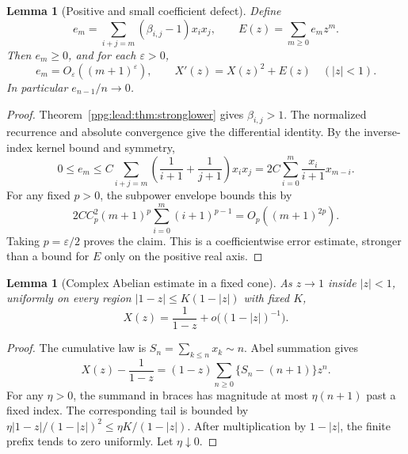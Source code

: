 \documentclass[11pt,letterpaper]{article}
\newtheorem{lemma}[theorem]{Lemma}
\theoremstyle{remark}\newtheorem{remark}[theorem]{Remark}
\numberwithin{equation}{section}
\begin{document}
\begin{lemma}[Positive and small coefficient defect]\label{ppg:lead:lem:defect}
Define
\[
 e_m=\sum_{i+j=m}(\beta_{i,j}-1)x_ix_j,\qquad
 E(z)=\sum_{m\ge0}e_mz^m.
\]
Then $e_m\ge0$, and for each $\varepsilon>0$,
\begin{equation}\label{ppg:lead:eq:smallE}
 e_m=O_\varepsilon((m+1)^\varepsilon),\qquad
 X'(z)=X(z)^2+E(z)\quad(|z|<1).
\end{equation}
In particular $e_{n-1}/n\to0$.
\end{lemma}
\begin{proof}
Theorem~\ref{ppg:lead:thm:stronglower} gives $\beta_{i,j}>1$. The normalized recurrence and absolute convergence give the differential identity. By the inverse-index kernel bound and symmetry,
\[
 0\le e_m\le C\sum_{i+j=m}
 \left(\frac1{i+1}+\frac1{j+1}\right)x_ix_j
 =2C\sum_{i=0}^m\frac{x_i}{i+1}x_{m-i}.
\]
For any fixed $p>0$, the subpower envelope bounds this by
\[
 2CC_p^2(m+1)^p\sum_{i=0}^m(i+1)^{p-1}
 =O_p((m+1)^{2p}).
\]
Taking $p=\varepsilon/2$ proves the claim. This is a coefficientwise error estimate, stronger than a bound for $E$ only on the positive real axis.
\end{proof}

\begin{lemma}[Complex Abelian estimate in a fixed cone]\label{ppg:lead:lem:cone}
As $z\to1$ inside $|z|<1$, uniformly on every region
$|1-z|\le K(1-|z|)$ with fixed $K$,
\begin{equation}\label{ppg:lead:eq:cone}
 X(z)=\frac1{1-z}+o\bigl((1-|z|)^{-1}\bigr).
\end{equation}
\end{lemma}
\begin{proof}
The cumulative law is $S_n=\sum_{k\le n}x_k\sim n$. Abel summation gives
\[
 X(z)-\frac1{1-z}=(1-z)\sum_{n\ge0}\{S_n-(n+1)\}z^n.
\]
For any $\eta>0$, the summand in braces has magnitude at most $\eta(n+1)$ past a fixed index. The corresponding tail is bounded by
$\eta|1-z|/(1-|z|)^2\le\eta K/(1-|z|)$.
After multiplication by $1-|z|$, the finite prefix tends to zero uniformly. Let $\eta\downarrow0$.
\end{proof}
\end{document}
